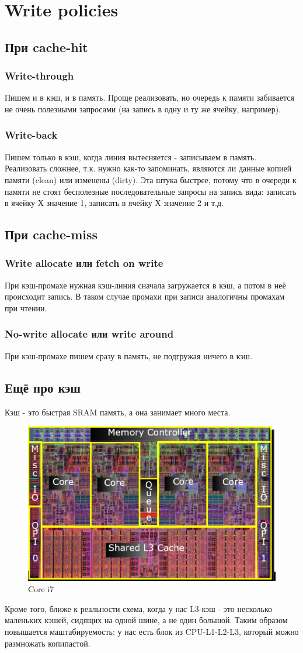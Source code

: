 \documentclass[12pt, a4paper]{article}
\begin{document}
\section{Write policies}
\subsection{При cache-hit}
\subsubsection{Write-through}
Пишем и в кэш, и в память. Проще реализовать, но очередь к памяти забивается не очень полезными запросами (на запись в одну и ту же ячейку, например).
\subsubsection{Write-back}
Пишем только в кэш, когда линия вытесняется - записываем в память. Реализовать сложнее, т.к. нужно как-то запоминать, являются ли данные копией памяти (clean) или изменены (dirty). Эта штука быстрее, потому что в очереди к памяти не стоят бесполезные последовательные запросы на запись вида: записать в ячейку Х значение 1, записать в ячейку Х значение 2 и т.д.
\subsection{При cache-miss}
\subsubsection{Write allocate или fetch on write}
При кэш-промахе нужная кэш-линия сначала загружается в кэш, а потом в неё происходит запись. В таком случае промахи при записи аналогичны промахам при чтении.
\subsubsection{No-write allocate или write around}
При кэш-промахе пишем сразу в память, не подгружая ничего в кэш.
\subsection{Ещё про кэш}
Кэш - это быстрая SRAM память, а она занимает много места.\\ 
\begin{figure}[h]
    \centering
    \includegraphics[width=0.6\linewidth]{./images/Core.png}
    \caption{Core i7}
    \label{fig:Core}
\end{figure}
Кроме того, ближе к реальности схема, когда у нас L3-кэш - это несколько маленьких кэшей, сидящих на одной шине, а не один большой. Таким образом повышается маштабируемость: у нас есть блок из CPU-L1-L2-L3, который можно размножать копипастой.
\end{document}
